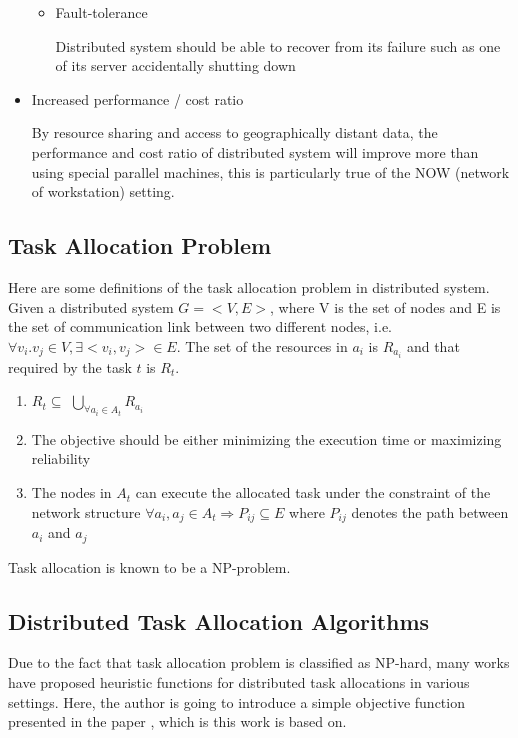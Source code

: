 \begin{itemize}
\begin{itemize}
      	\item{Fault-tolerance}
	
	Distributed system should be able to recover from its failure such as one of its server accidentally shutting down
	
    \end{itemize}
    
    
   \item{Increased performance / cost ratio}
   
     By resource sharing and access to geographically distant data, the performance and cost ratio of distributed system will improve more than using special parallel machines, this is particularly true of the NOW (network of workstation) setting.
     
\end{itemize}

\subsection{Task Allocation Problem}

Here are some definitions of the task allocation problem in distributed system. \cite{definition}
Given a distributed system $G = <V, E>$, where V is the set of nodes and E is the set of communication link between two different nodes, i.e. $\forall v_i. v_j \in V, \exists <v_i, v_j> \in E$.  The set of the resources in $a_i$ is $R_{a_i}$ and that required by the task $t$ is $R_t$.

\begin{enumerate}
	\item{$R_t \subseteq$ $\bigcup_{\forall a_i \in A_t} R_{a_i}$}
	\item{The objective should be either minimizing the execution time \cite{time} or maximizing reliability \cite{reliability}}
	\item{The nodes in $A_t$ can execute the allocated task under the constraint of the network structure $\forall a_i, a_j \in A_t \Rightarrow P_{ij} \subseteq E$ where $P_{ij}$ denotes the path between $a_i$ and $a_j$}
\end{enumerate}

Task allocation is known to be a NP-problem. \cite{np}

\subsection{Distributed Task Allocation Algorithms}

Due to the fact that task allocation problem is classified as NP-hard, many works have proposed heuristic functions for distributed task allocations in various settings.  Here, the author is going to introduce a simple objective function presented in the paper \cite{algorithm}, which is this work is based on.

